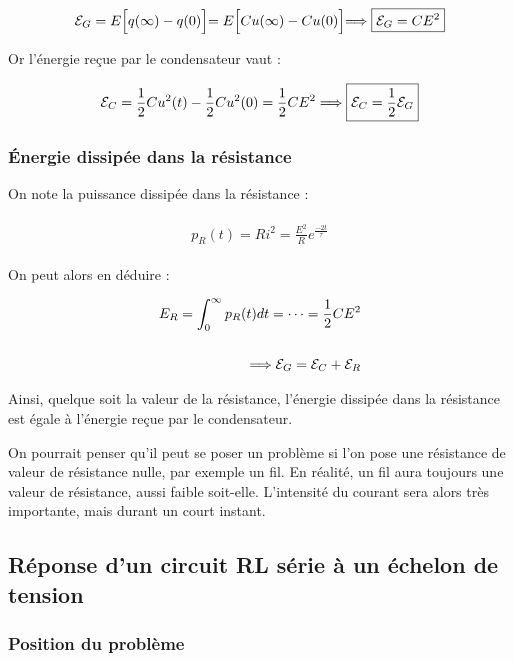 \documentclass{article}
\begin{document}

\begin{align*}\begin{split}
\mathcal{E}_G=E\Bigl[q(\infty)-q(0)\Bigl] = E\Bigl[Cu(\infty)-Cu(0)\Bigl]
\Longrightarrow \boxed{\mathcal{E}_G=CE^2}
\end{split}\end{align*}

Or l'énergie reçue par le condensateur vaut :

\begin{align*}\begin{split}
\mathcal{E}_C=\frac{1}{2}Cu^2(t)-\frac{1}{2}Cu^2(0)=\frac{1}{2}CE^2
\Longrightarrow \boxed{\mathcal{E}_C = \frac{1}{2}\mathcal{E}_G}
\end{split}\end{align*}

\subsubsection{Énergie dissipée dans la résistance}

On note la puissance dissipée dans la résistance :

\begin{align*}\begin{split}
p_R(t)=Ri^2=\frac{E^2}{R}e^\frac{-2t}{\tau}
\end{split}\end{align*}

On peut alors en déduire :

\begin{align*}\begin{split}
E_R=\int_{0}^{\infty}p_R(t)dt = \dots = \frac{1}{2}CE^2\\\\
\Longrightarrow \mathcal{E}_G=\mathcal{E}_C+\mathcal{E}_R
\end{split}\end{align*}

Ainsi, quelque soit la valeur de la résistance, l'énergie dissipée dans la résistance est égale à l'énergie reçue par le condensateur.

On pourrait penser qu'il peut se poser un problème si l'on pose une résistance de valeur de résistance nulle, par exemple un fil. En réalité, un fil aura toujours une valeur de résistance, aussi faible soit-elle. L'intensité du courant sera alors très importante, mais durant un court instant.

\subsection{Réponse d'un circuit RL série à un échelon de tension}

\subsubsection{Position du problème}

\end{document}
